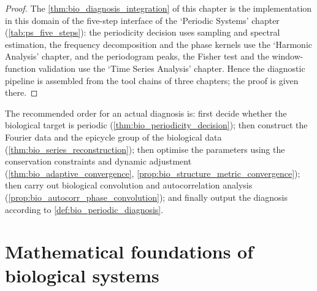 \begin{proof}
The \cref{thm:bio_diagnosis_integration} of this chapter is the implementation in this domain of the five-step interface of the `Periodic Systems' chapter (\cref{tab:ps_five_steps}):
the periodicity decision uses sampling and spectral estimation, the frequency decomposition and the phase kernels use the `Harmonic Analysis' chapter, and the periodogram peaks, the Fisher test and the
window-function validation use the `Time Series Analysis' chapter. Hence the diagnostic pipeline is assembled from the tool chains of three chapters; the proof is given there.
\end{proof}

\begin{remark}\label{rem:bio_integration_order}
The recommended order for an actual diagnosis is: first decide whether the biological target is periodic (\cref{thm:bio_periodicity_decision}); then construct the Fourier data and the epicycle group of the biological data (\cref{thm:bio_series_reconstruction}); then optimise the parameters using the conservation constraints and dynamic adjustment (\cref{thm:bio_adaptive_convergence}, \cref{prop:bio_structure_metric_convergence}); then carry out biological convolution and autocorrelation analysis (\cref{prop:bio_autocorr_phase_convolution}); and finally output the diagnosis according to \cref{def:bio_periodic_diagnosis}.
\end{remark}

\section{Mathematical foundations of biological systems}

